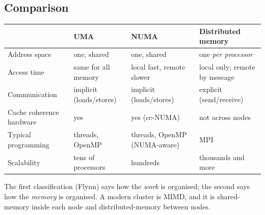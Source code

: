 \begin{center}
\end{center}

\subsection{Comparison}

\begin{center}
\small
\begin{tabularx}{\linewidth}{@{}l X X X@{}}
\toprule
 & \textbf{UMA} & \textbf{NUMA} & \textbf{Distributed memory}\\
\midrule
Address space & one, shared & one, shared & one \emph{per processor}\\
Access time & same for all memory & local fast, remote slower & local only; remote by message\\
Communication & implicit (loads/stores) & implicit (loads/stores) & explicit (send/receive)\\
Cache coherence hardware & yes & yes (cc-NUMA) & not across nodes\\
Typical programming & threads, OpenMP & threads, OpenMP (NUMA-aware) & MPI\\
Scalability & tens of processors & hundreds & thousands and more\\
\bottomrule
\end{tabularx}
\end{center}

\begin{keyidea}
The first classification (Flynn) says how the \emph{work} is organised; the second says how the \emph{memory} is organised. A modern
cluster is MIMD, and it is shared-memory inside each node and distributed-memory between nodes.
\end{keyidea}

